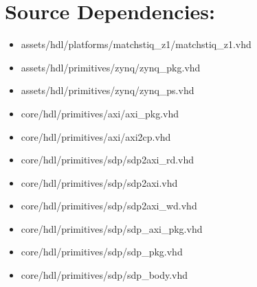 \documentclass{article}
\begin{document}
\newpage
\section*{Source Dependencies:}
\begin{itemize}
	\item
assets/hdl/platforms/matchstiq\_z1/matchstiq\_z1.vhd
	\item
assets/hdl/primitives/zynq/zynq\_pkg.vhd
	\item
assets/hdl/primitives/zynq/zynq\_ps.vhd
	\item
core/hdl/primitives/axi/axi\_pkg.vhd
	\item
core/hdl/primitives/axi/axi2cp.vhd
	\item
core/hdl/primitives/sdp/sdp2axi\_rd.vhd
	\item
core/hdl/primitives/sdp/sdp2axi.vhd
	\item
core/hdl/primitives/sdp/sdp2axi\_wd.vhd
	\item
core/hdl/primitives/sdp/sdp\_axi\_pkg.vhd
	\item
core/hdl/primitives/sdp/sdp\_pkg.vhd
	\item
core/hdl/primitives/sdp/sdp\_body.vhd
\end{itemize}
\end{document}
